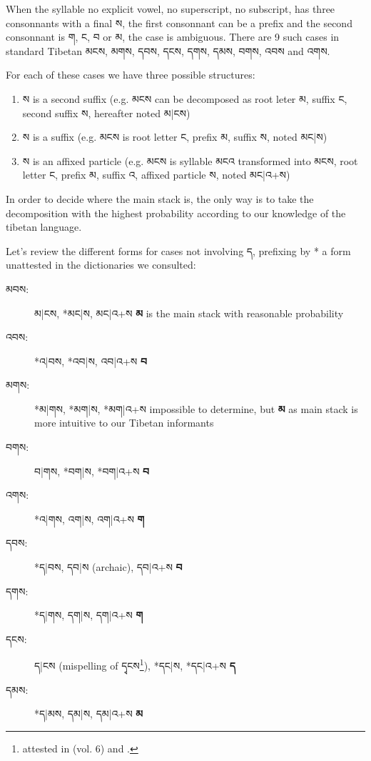 \documentclass[%
a4paper,%
pagesize,%
12pt,%
parskip=off,%
bibliography=totoc,%
numbers=noenddot,%
DIV=12,%
twoside=semi,%
headings=normal%
]{scrartcl}
\begin{document}
When the syllable no explicit vowel, no superscript, no subscript, has three consonnants with a final ས, the first consonnant can be a prefix and the second consonnant is ག, ང, བ or མ, the case is ambiguous. There are 9 such cases in standard Tibetan མངས, མགས, དབས, དངས, དགས, དམས, བགས, འབས and འགས.

For each of these cases we have three possible structures:
\begin{enumerate}
\item ས is a second suffix (e.g. མངས can be decomposed as root leter མ, suffix ང, second suffix ས, hereafter noted མ|ངས)
\item ས is a suffix (e.g. མངས is root letter ང, prefix མ, suffix ས, noted མང|ས)
\item ས is an affixed particle (e.g. མངས is syllable མངའ transformed into མངས, root letter ང, prefix མ, suffix འ, affixed particle ས, noted མང|འ+ས)
\end{enumerate}

In order to decide where the main stack is, the only way is to take the decomposition with the highest probability according to our knowledge of the tibetan language.

Let's review the different forms for cases not involving ད, prefixing by * a form unattested in the dictionaries we consulted:

\begin{description}
\item[མབས:] མ|ངས, *མང|ས, མང|འ+ས \rightarrow{} \textbf{མ} is the main stack with reasonable probability
\item[འབས:] *འ|བས, *འབ|ས, འབ|འ+ས \rightarrow{} \textbf{བ}
\item[མགས:] *མ|གས, *མག|ས, *མག|འ+ས \rightarrow{} impossible to determine, but \textbf{མ} as main stack is more intuitive to our Tibetan informants
\item[བགས:] བ|གས, *བག|ས, *བག|འ+ས \rightarrow{} \textbf{བ}
\item[འགས:] *འ|གས, འག|ས, འག|འ+ས \rightarrow{} \textbf{ག}
\item[དབས:] *ད|བས, དབ|ས (archaic), དབ|འ+ས \rightarrow{} \textbf{བ}
\item[དགས:] *ད|གས, དག|ས, དག|འ+ས \rightarrow{} \textbf{ག}
\item[དངས:] ད|ངས (mispelling of དྭངས\footnote{attested in \cite{NegiDict} (vol. 6) and \cite{Illuminator}.}), *དང|ས, *དང|འ+ས \rightarrow{} \textbf{ད}
\item[དམས:] *ད|མས, དམ|ས, དམ|འ+ས \rightarrow{} \textbf{མ}
\end{description}
\end{document}
